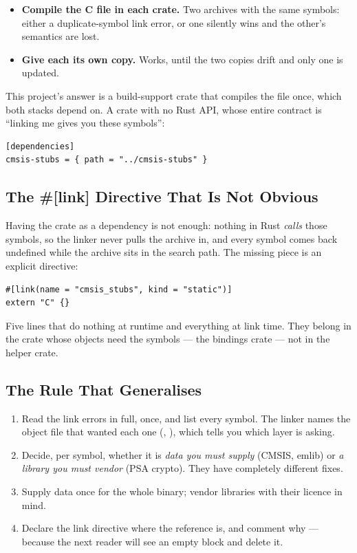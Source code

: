 \begin{itemize}
    \item \textbf{Compile the C file in each crate.} Two archives with the same symbols: either a
          duplicate-symbol link error, or one silently wins and the other's semantics are lost.
    \item \textbf{Give each its own copy.} Works, until the two copies drift and only one is updated.
\end{itemize}

This project's answer is a build-support crate that compiles the file once, which both stacks depend
on. A crate with no Rust API, whose entire contract is ``linking me gives you these symbols'':

\begin{verbatim}
[dependencies]
cmsis-stubs = { path = "../cmsis-stubs" }
\end{verbatim}

\subsection{The \#[link] Directive That Is Not Obvious}

Having the crate as a dependency is not enough: nothing in Rust \emph{calls} those symbols, so the
linker never pulls the archive in, and every symbol comes back undefined while the archive sits in the
search path. The missing piece is an explicit directive:

\begin{verbatim}
#[link(name = "cmsis_stubs", kind = "static")]
extern "C" {}
\end{verbatim}

Five lines that do nothing at runtime and everything at link time. They belong in the crate whose
objects need the symbols — the bindings crate — not in the helper crate.

\subsection{The Rule That Generalises}

\begin{enumerate}
    \item Read the link errors in full, once, and list every symbol. The linker names the object file
          that wanted each one (, ), which tells you
          which layer is asking.
    \item Decide, per symbol, whether it is \emph{data you must supply} (CMSIS, emlib) or \emph{a
          library you must vendor} (PSA crypto). They have completely different fixes.
    \item Supply data once for the whole binary; vendor libraries with their licence in mind.
    \item Declare the link directive where the reference is, and comment why — because the next reader
          will see an empty  block and delete it.
\end{enumerate}
